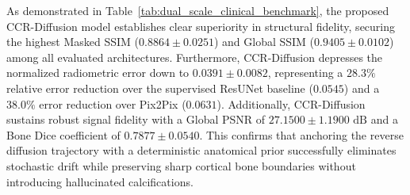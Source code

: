 As demonstrated in Table~\ref{tab:dual_scale_clinical_benchmark}, the proposed CCR-Diffusion model establishes clear superiority in structural fidelity, securing the highest Masked SSIM ($\mathbf{0.8864 \pm 0.0251}$) and Global SSIM ($\mathbf{0.9405 \pm 0.0102}$) among all evaluated architectures. Furthermore, CCR-Diffusion depresses the normalized radiometric error down to $\mathbf{0.0391 \pm 0.0082}$, representing a $28.3\%$ relative error reduction over the supervised ResUNet baseline ($0.0545$) and a $38.0\%$ error reduction over Pix2Pix ($0.0631$). Additionally, CCR-Diffusion sustains robust signal fidelity with a Global PSNR of $27.1500 \pm 1.1900\text{ dB}$ and a Bone Dice coefficient of $0.7877 \pm 0.0540$. This confirms that anchoring the reverse diffusion trajectory with a deterministic anatomical prior successfully eliminates stochastic drift while preserving sharp cortical bone boundaries without introducing hallucinated calcifications.

